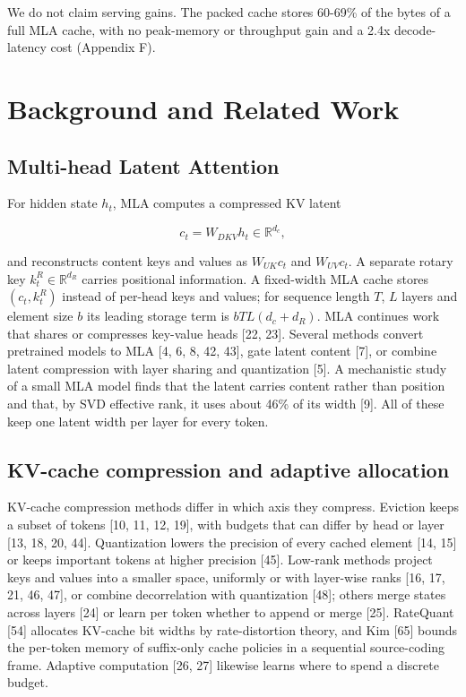 \documentclass[10pt]{article}
\begin{document}
We do not claim serving gains. The packed cache stores 60-69\% of the bytes of a full MLA cache, with no peak-memory or throughput gain and a 2.4x decode-latency cost (Appendix F).

\section{Background and Related Work}

\subsection{Multi-head Latent Attention}

For hidden state $h_t$, MLA computes a compressed KV latent

\[c_t = W_{DKV}h_t \in \mathbb{R}^{d_c},\]

and reconstructs content keys and values as $W_{UK}c_t$ and $W_{UV}c_t$. A separate rotary key $k_t^R \in \mathbb{R}^{d_R}$ carries positional information. A fixed-width MLA cache stores $(c_t,k_t^R)$ instead of per-head keys and values; for sequence length $T$, $L$ layers and element size $b$ its leading storage term is $bTL(d_c+d_R)$. MLA continues work that shares or compresses key-value heads [22, 23]. Several methods convert pretrained models to MLA [4, 6, 8, 42, 43], gate latent content [7], or combine latent compression with layer sharing and quantization [5]. A mechanistic study of a small MLA model finds that the latent carries content rather than position and that, by SVD effective rank, it uses about 46\% of its width [9]. All of these keep one latent width per layer for every token.

\subsection{KV-cache compression and adaptive allocation}

KV-cache compression methods differ in which axis they compress. Eviction keeps a subset of tokens [10, 11, 12, 19], with budgets that can differ by head or layer [13, 18, 20, 44]. Quantization lowers the precision of every cached element [14, 15] or keeps important tokens at higher precision [45]. Low-rank methods project keys and values into a smaller space, uniformly or with layer-wise ranks [16, 17, 21, 46, 47], or combine decorrelation with quantization [48]; others merge states across layers [24] or learn per token whether to append or merge [25]. RateQuant [54] allocates KV-cache bit widths by rate-distortion theory, and Kim [65] bounds the per-token memory of suffix-only cache policies in a sequential source-coding frame. Adaptive computation [26, 27] likewise learns where to spend a discrete budget.
\end{document}
